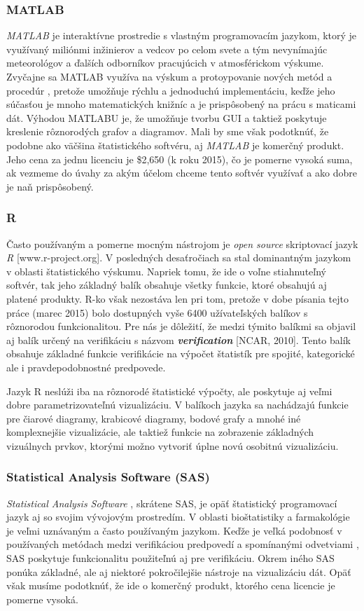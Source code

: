 \subsubsection{MATLAB}
\textit{MATLAB} je interaktívne prostredie s vlastným programovacím jazykom, ktorý je využívaný miliónmi inžinierov a vedcov po celom svete \cite{Matlab} a tým nevynímajúc meteorológov a ďalších odborníkov pracujúcich v atmosférickom výskume. 
Zvyčajne sa MATLAB využíva na výskum a protoypovanie nových metód a procedúr \cite{VerifSoft}, pretože umožňuje rýchlu a jednoduchú implementáciu, keďže jeho súčasťou je mnoho matematických knižníc a je prispôsobený na prácu s maticami dát.
Výhodou MATLABU je, že umožňuje tvorbu GUI a taktiež poskytuje kreslenie rôznorodých grafov a diagramov.
Mali by sme však podotknúť, že podobne ako väčšina štatistického softvéru, aj \textit{MATLAB} je komerčný produkt. Jeho cena za jednu licenciu je \$2,650 (k roku 2015), čo je pomerne vysoká suma, ak vezmeme do úvahy za akým účelom chceme tento softvér využívať a ako dobre je naň prispôsobený.

\subsubsection{R}
Často používaným a pomerne mocným nástrojom je \textit{open source} skriptovací jazyk \textit{R} [www.r-project.org]. V posledných desaťročiach sa stal dominantným jazykom v oblasti štatistického výskumu. Napriek tomu, že ide o voľne stiahnuteľný softvér, tak jeho základný balík obsahuje všetky funkcie, ktoré obsahujú aj platené produkty. R-ko však nezostáva len pri tom, pretože v dobe písania tejto práce (marec 2015) bolo dostupných vyše 6400 užívateľských balíkov s rôznorodou funkcionalitou. Pre nás je dôležití, že medzi týmito balíkmi sa objavil aj balík určený na verifikáciu s názvom \textit{\textbf{verification}} [NCAR, 2010]. Tento balík obsahuje základné funkcie verifikácie na výpočet štatistík pre spojité, kategorické ale i pravdepodobnostné predpovede. 

Jazyk R neslúži iba na rôznorodé štatistické výpočty, ale poskytuje aj veľmi dobre parametrizovateľnú vizualizáciu. V balíkoch jazyka sa nachádzajú funkcie pre čiarové diagramy, krabicové diagramy, bodové grafy a mnohé iné komplexnejšie vizualizácie, ale taktiež funkcie na zobrazenie základných vizuálnych prvkov, ktorými možno vytvoriť úplne novú osobitnú vizualizáciu.

\subsubsection[SAS]{Statistical Analysis Software (SAS)}
\textit{Statistical Analysis Software} \cite{SAS}, skrátene SAS, je opäť štatistický programovací jazyk aj so svojim vývojovým prostredím. V oblasti bioštatistiky a farmakológie je veľmi uznávaným a často používaným jazykom. Keďže je veľká podobnosť v používaných metódach medzi verifikáciou predpovedí a spomínanými odvetviami \cite{VerifSoft}, SAS poskytuje funkcionalitu použiteľnú aj pre verifikáciu. Okrem iného SAS ponúka základné, ale aj niektoré pokročilejšie nástroje na vizualizáciu dát. Opäť však musíme podotknúť, že ide o komerčný produkt, ktorého cena licencie je pomerne vysoká.

